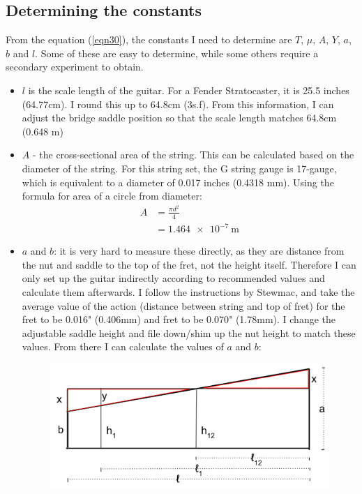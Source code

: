 \documentclass[11pt]{article}
\begin{document}
\begin{flushleft}
        \subsection{Determining the constants}
            From the equation (\ref{eqn30}), the constants I need to determine are $T$, $\mu$, $A$, $Y$, $a$, $b$ and $l$. Some of these are easy to determine, while some others require a secondary experiment to obtain. 
            \begin{itemize}
                \item $l$ is the scale length of the guitar. For a Fender Stratocaster, it is 25.5 inches (64.77cm). I round this up to 64.8cm (3s.f). From this information, I can adjust the bridge saddle position so that the scale length matches 64.8cm (0.648 m)
                \item $A$ - the cross-sectional area of the string. This can be calculated based on the diameter of the string. For this string set, the G string gauge is 17-gauge, which is equivalent to a diameter of 0.017 inches (0.4318 mm). Using the formula for area of a circle from diameter:
                \begin{align*}
                    A &= \frac{\pi d^2}{4} \\
                    &= \SI{1.464e-7}{\meter}
                \end{align*}
                \item $a$ and $b$: it is very hard to measure these directly, as they are distance from the nut and saddle to the top of the fret, not the height itself. Therefore I can only set up the guitar indirectly according to recommended values and calculate them afterwards. I follow the instructions by Stewmac, and take the average value of the action (distance between string and top of fret) for the  fret to be 0.016" (0.406mm) and  fret to be 0.070" (1.78mm). I change the adjustable saddle height and file down/shim up the nut height to match these values. From there I can calculate the values of $a$ and $b$: \\
                \begin{figure}[ht]
                    \includegraphics[width = \textwidth]{fig4.png}

\end{figure}
\end{itemize}
\end{flushleft}
\end{document}
